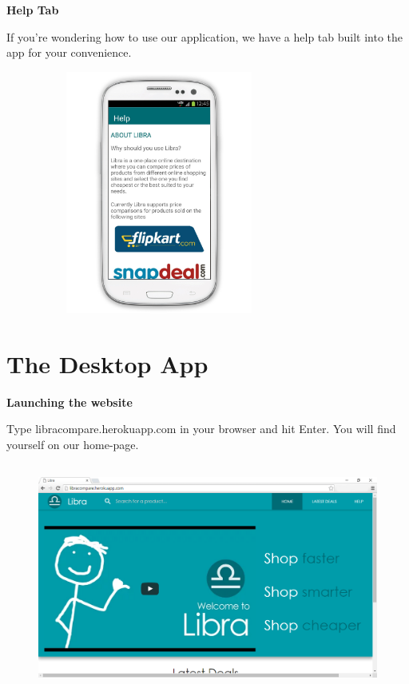 \textbf{\large Help Tab}\\
\vspace{2mm}

If you’re wondering how to use our application, we have a help tab built into the app for your convenience.

\begin{figure}[h!]
\centering
\includegraphics[width=8cm, height=8cm]{figure/helptab.png}
\end{figure}

\newpage

\section{The Desktop App} 

\textbf{\large Launching the website}\\
\vspace{2mm}

Type libracompare.herokuapp.com in your browser and hit Enter. You will find yourself on our home-page.

\begin{figure}[h!]
\centering
\includegraphics[width=13cm, height=7.5cm]{figure/home.png}
\end{figure}



